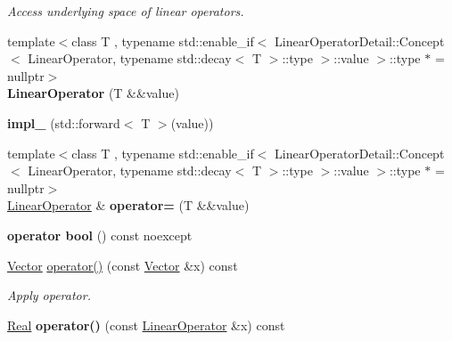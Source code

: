 \begin{DoxyCompactItemize}
\begin{DoxyCompactList}\small\item\em Access underlying space of linear operators. \end{DoxyCompactList}\item 
\hypertarget{classSpacy_1_1LinearOperator_ac8c1647e64c14ce857def39e0148baed}{{\footnotesize template$<$class T , typename std\-::enable\-\_\-if$<$ Linear\-Operator\-Detail\-::\-Concept$<$ Linear\-Operator, typename std\-::decay$<$ T $>$\-::type $>$\-::value $>$\-::type $\ast$  = nullptr$>$ }\\{\bfseries Linear\-Operator} (T \&\&value)}\label{classSpacy_1_1LinearOperator_ac8c1647e64c14ce857def39e0148baed}

\item 
\hypertarget{classSpacy_1_1LinearOperator_a1ff1e3cfdad22ad6842bb6161dcf87a4}{{\bfseries impl\-\_\-} (std\-::forward$<$ T $>$(value))}\label{classSpacy_1_1LinearOperator_a1ff1e3cfdad22ad6842bb6161dcf87a4}

\item 
\hypertarget{classSpacy_1_1LinearOperator_a5028289a4b4b38067800ce0514ae34fc}{{\footnotesize template$<$class T , typename std\-::enable\-\_\-if$<$ Linear\-Operator\-Detail\-::\-Concept$<$ Linear\-Operator, typename std\-::decay$<$ T $>$\-::type $>$\-::value $>$\-::type $\ast$  = nullptr$>$ }\\\hyperlink{classSpacy_1_1LinearOperator}{Linear\-Operator} \& {\bfseries operator=} (T \&\&value)}\label{classSpacy_1_1LinearOperator_a5028289a4b4b38067800ce0514ae34fc}

\item 
\hypertarget{classSpacy_1_1LinearOperator_a48506fbca4e85aa239f80332cf6c37c1}{{\bfseries operator bool} () const noexcept}\label{classSpacy_1_1LinearOperator_a48506fbca4e85aa239f80332cf6c37c1}

\item 
\hypertarget{classSpacy_1_1LinearOperator_a54d74eb77e706ee2e087a0363929e946}{\hyperlink{classSpacy_1_1Vector}{Vector} \hyperlink{classSpacy_1_1LinearOperator_a54d74eb77e706ee2e087a0363929e946}{operator()} (const \hyperlink{classSpacy_1_1Vector}{Vector} \&x) const }\label{classSpacy_1_1LinearOperator_a54d74eb77e706ee2e087a0363929e946}

\begin{DoxyCompactList}\small\item\em Apply operator. \end{DoxyCompactList}\item 
\hypertarget{classSpacy_1_1LinearOperator_a75400dbcfa651fed1b37f58a8e722b90}{\hyperlink{classSpacy_1_1Real}{Real} {\bfseries operator()} (const \hyperlink{classSpacy_1_1LinearOperator}{Linear\-Operator} \&x) const }\label{classSpacy_1_1LinearOperator_a75400dbcfa651fed1b37f58a8e722b90}


\end{DoxyCompactItemize}
